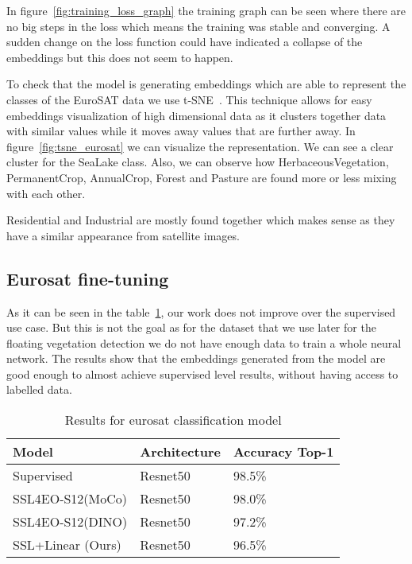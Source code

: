 \documentclass[conference]{IEEEtran}
\begin{document}
    In figure~\ref{fig:training_loss_graph} the training graph can be seen where there are no big steps in the loss which means the training was stable and converging.
    A sudden change on the loss function could have indicated a collapse of the embeddings but this does not seem to happen.

    To check that the model is generating embeddings which are able to represent the classes of the EuroSAT data we use t-SNE~\cite{JMLR:v9:vandermaaten08a}.
    This technique allows for easy embeddings visualization of high dimensional data as it clusters together data with similar values while it moves away
    values that are further away.
    In figure~\ref{fig:tsne_eurosat} we can visualize the representation.
    We can see a clear cluster for the SeaLake class.
    Also, we can observe how HerbaceousVegetation, PermanentCrop, AnnualCrop, Forest and Pasture are found more or less mixing with each other.

    Residential and Industrial are mostly found together which makes sense as they have a similar appearance from satellite images.

    \subsection{Eurosat fine-tuning}

    As it can be seen in the table~\ref{table:eurosat_results}, our work does not improve over the supervised use case.
    But this is not the goal as for the dataset that we use later for the floating vegetation detection we do not have enough
    data to train a whole neural network.
    The results show that the embeddings generated from the model are good enough to almost achieve supervised level results,
    without having access to labelled data.


    \begin{table}[h!]
        \centering
        \begin{tabular}{ |p{3cm}||p{2cm}|p{2cm}|}
            \hline
            Model                                    & Architecture & Accuracy Top-1 \\
            \hline
            \hline
            Supervised                               & Resnet50     & 98.5\%         \\
            SSL4EO-S12(MoCo)\cite{wang2023ssl4eos12} & Resnet50     & 98.0\%         \\
            SSL4EO-S12(DINO)\cite{wang2023ssl4eos12} & Resnet50     & 97.2\%         \\
            SSL+Linear (Ours)                        & Resnet50     & 96.5\%         \\
            \hline
        \end{tabular}
        \caption{Results for eurosat classification model}
        \label{table:eurosat_results}
    \end{table}
\end{document}
